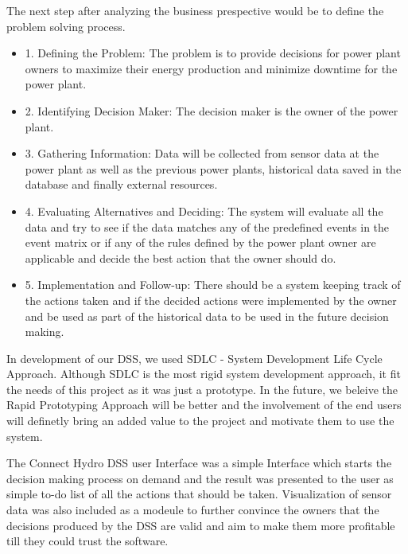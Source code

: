 The next step after analyzing the business prespective would be to define the problem solving process.
\begin{itemize}
	\item 1. Defining the Problem: The problem is to provide decisions for power plant owners to maximize their energy production and minimize downtime for the power plant.
	\item 2. Identifying Decision Maker: The decision maker is the owner of the power plant.
	\item 3. Gathering Information: Data will be collected from sensor data at the power plant as well as the previous power plants, historical data saved in the database and finally external resources.
	\item 4. Evaluating Alternatives and Deciding: The system will evaluate all the data and try to see if the data matches any of the predefined events in the event matrix or if any of the rules defined by the power plant owner are applicable and decide the best action that the owner should do.
	\item 5. Implementation and Follow-up: There should be a system keeping track of the actions taken and if the decided actions were implemented by the owner and be used as part of the historical data to be used in the future decision making.
\end{itemize}
In development of our DSS, we used SDLC - System Development Life Cycle Approach. Although SDLC is the most rigid system development approach, it fit the needs of this project as it was just a prototype. In the future, we beleive the Rapid Prototyping Approach will be better and the involvement of the end users will definetly bring an added value to the project and motivate them to use the system.

The Connect Hydro DSS user Interface was a simple Interface which starts the decision making process on demand and the result was presented to the user as simple to-do list of all the actions that should be taken. Visualization of sensor data was also included as a modeule to further convince the owners that the decisions produced by the DSS are valid and aim to make them more profitable till they could trust the software.
